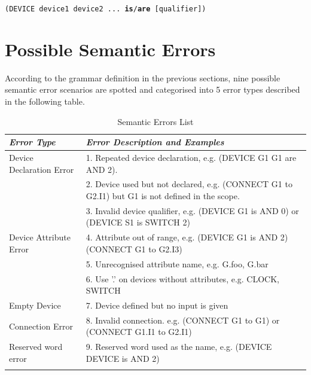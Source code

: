 \documentclass[12pt]{article}
\def\n{\noindent}
\begin{document}
\vspace{0.3cm} \n \texttt{(DEVICE device1 device2 ... \textbf{is}/\textbf{are}
   [qualifier])} \vspace{0.3cm}

\section{Possible Semantic Errors}
\n According to the grammar definition in the previous sections, nine possible semantic error scenarios are spotted and categorised into 5 error types described in the following table. 
\begin{table}[H]
\centering
\begin{longtable}{p{5cm}p{10cm}}
\textit{Error Type} & {\textit{Error Description and Examples}}\\
\toprule
\addlinespace[0.2cm]
Device Declaration Error & 1. Repeated device declaration, \newline e.g. (DEVICE G1 G1 are AND 2). \\
\addlinespace[0.2cm]
& 2. Device used but not declared, \newline e.g. (CONNECT G1 to G2.I1) but G1 is not defined in the scope.\\
\addlinespace[0.2cm]
& 3. Invalid device qualifier, \newline e.g. (DEVICE G1 is AND 0) or (DEVICE S1 is SWITCH 2)\\
\addlinespace[0.2cm]
Device Attribute Error & 4. Attribute out of range, \newline e.g. (DEVICE G1 is AND 2)(CONNECT G1 to G2.I3)\\
\addlinespace[0.2cm]
& 5. Unrecognised attribute name, \newline e.g. G.foo, G.bar\\
\addlinespace[0.2cm]
& 6. Use '.' on devices without attributes, \newline e.g. CLOCK, SWITCH\\
\addlinespace[0.2cm]
Empty Device & 7. Device defined but no input is given\\
\addlinespace[0.2cm]
Connection Error & 8. Invalid connection. \newline e.g. (CONNECT G1 to G1) or (CONNECT G1.I1 to G2.I1)\\
\addlinespace[0.2cm]
Reserved word error & 9. Reserved word used as the name, \newline e.g. (DEVICE DEVICE is AND 2)\\
\addlinespace[0.2cm]
\end{longtable}
\caption{Semantic Errors List}
\end{table}
\end{document}
